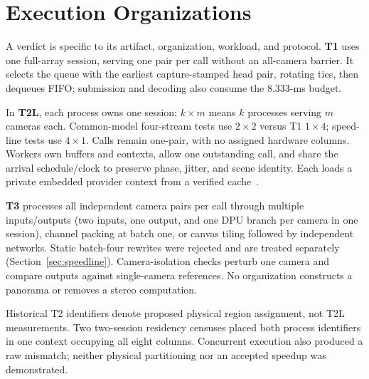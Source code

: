 \documentclass[sigconf,review,anonymous]{acmart}
\begin{document}
\section{Execution Organizations}
\label{sec:fam}
A verdict is specific to its artifact, organization, workload, and protocol. \textbf{T1} uses one full-array session, serving one pair per call without an all-camera barrier. It selects the queue with the earliest capture-stamped head pair, rotating ties, then dequeues FIFO; submission and decoding also consume the 8.333-ms budget.

In \textbf{T2L}, each process owns one session; $k\times m$ means $k$ processes serving $m$ cameras each. Common-model four-stream tests use $2\times2$ versus T1 $1\times4$; speed-line tests use $4\times1$. Calls remain one-pair, with no assigned hardware columns. Workers own buffers and contexts, allow one outstanding call, and share the arrival schedule/clock to preserve phase, jitter, and scene identity. Each loads a private embedded provider context from a verified cache~\cite{amdcontext}.

\textbf{T3} processes all independent camera pairs per call through multiple inputs/outputs (two inputs, one output, and one DPU branch per camera in one session), channel packing at batch one, or canvas tiling followed by independent networks. Static batch-four rewrites were rejected and are treated separately (Section~\ref{sec:speedline}). Camera-isolation checks perturb one camera and compare outputs against single-camera references. No organization constructs a panorama or removes a stereo computation.

Historical T2 identifiers denote proposed physical region assignment, not T2L measurements. Two two-session residency censuses placed both process identifiers in one context occupying all eight columns. Concurrent execution also produced a raw mismatch; neither physical partitioning nor an accepted speedup was demonstrated.
\end{document}
